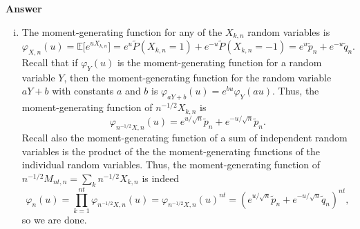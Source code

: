 \documentclass[11pt]{article}
\newcommand\E{\mathbb{E}}
\newenvironment{hwanswer}
    {
        \vspace{2mm}
        {\bfseries Answer}
        \vspace{-\abovedisplayskip}
        \begin{center}
            \begin{tcolorbox}[
                width=0.95\textwidth,
                colback=white,
                colframe=white,
                opacityback=0,
                opacityframe=0,
                boxrule=0pt,
                frame hidden,
                breakable,
                before upper={\parindent15pt} %
            ]
            \lineskip=0pt %
    }
    {
        \end{tcolorbox}
        \end{center}
        \vspace{4mm}
    }
\begin{document}
    \begin{hwanswer}
        \begin{enumerate}[(i)]
            \item The moment-generating function for any of the $X_{k,n}$ random variables
            is
            \[
                \varphi_{X,n}(u)
                =
                \E\big[ e^{u X_{k,n}} \big]
                =
                e^{u} \tilde{P}(X_{k,n} = 1)
                +
                e^{-u} \tilde{P}(X_{k,n} = -1)
                =
                e^{u} \tilde{p}_n
                +
                e^{-u} \tilde{q}_n.
            \]
            Recall that if $\varphi_Y(u)$ is the moment-generating function for a random
            variable $Y$, then the moment-generating function for the random variable $aY
            + b$ with constants $a$ and $b$ is $\varphi_{aY+b}(u) = e^{bu} \varphi_{Y}(au)$.
            Thus, the moment-generating function of $n^{-1/2} X_{k,n}$ is
            \[
                \varphi_{n^{-1/2} X, n}(u)
                =
                e^{u/\sqrt{n}} \tilde{p}_n
                +
                e^{-u/\sqrt{n}} \tilde{p}_n.
            \]
            Recall also the moment-generating function of a sum of independent random
            variables is the product of the the moment-generating functions of the
            individual random variables. Thus, the moment-generating function of $n^{-1/2}
            M_{nt,n} = \sum_{k} n^{-1/2} X_{k,n}$ is indeed
            \[
                \varphi_{n}(u)
                =
                \prod_{k=1}^{nt}
                \varphi_{n^{-1/2} X, n}(u)
                =
                \varphi_{n^{-1/2} X, n}(u)^{nt}
                =
                \left(
                    e^{u/\sqrt{n}} \tilde{p}_n + e^{-u/\sqrt{n}} \tilde{q}_n
                \right)^{nt},
            \]
            so we are done.


\end{enumerate}
\end{hwanswer}
\end{document}
